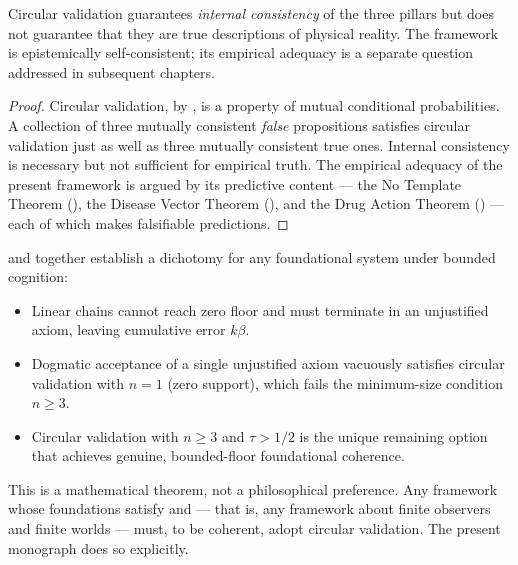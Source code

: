 \begin{corollary}
\label{cor:cv-no-truth}
Circular validation guarantees \emph{internal consistency} of the three
pillars but does not guarantee that they are true descriptions of physical
reality.  The framework is epistemically self-consistent; its empirical
adequacy is a separate question addressed in subsequent chapters.
\end{corollary}

\begin{proof}
Circular validation, by , is a property of
mutual conditional probabilities.  A collection of three mutually consistent
\emph{false} propositions satisfies circular validation just as well as three
mutually consistent true ones.  Internal consistency is necessary but not
sufficient for empirical truth.  The empirical adequacy of the present
framework is argued by its predictive content — the No Template Theorem
(), the Disease Vector Theorem (), and
the Drug Action Theorem () — each of which makes falsifiable
predictions.
\end{proof}

\begin{remark}
\label{rem:necessity-circular}
 and  together establish
a dichotomy for any foundational system under bounded cognition:
\begin{itemize}
  \item Linear chains cannot reach zero floor and must terminate in an
    unjustified axiom, leaving cumulative error $k\beta$.
  \item Dogmatic acceptance of a single unjustified axiom vacuously satisfies
    circular validation with $n = 1$ (zero support), which fails the
    minimum-size condition $n \geq 3$.
  \item Circular validation with $n \geq 3$ and $\tau > 1/2$ is the unique
    remaining option that achieves genuine, bounded-floor foundational
    coherence.
\end{itemize}
This is a mathematical theorem, not a philosophical preference.  Any
framework whose foundations satisfy  and
 — that is, any framework about finite observers
and finite worlds — must, to be coherent, adopt circular validation.  The
present monograph does so explicitly.
\end{remark}
